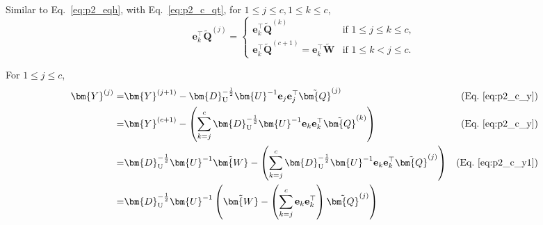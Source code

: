 \documentclass{article} %
\begin{document}
Similar to Eq.~\ref{eq:p2_eqh}, with Eq.~\ref{eq:p2_c_qt}, for $1 \le j \le c, 1 \le k \le c$,
\begin{equation}
\mathbf{e}_{k}^\top \tilde{\bm{Q}}^{(j)}
= \begin{cases}
\mathbf{e}_{k}^\top \tilde{\bm{Q}}^{(k)} & \text{if } 1 \le j \le k \le c ,\\
\mathbf{e}_{k}^\top \tilde{\bm{Q}}^{(c+1)} = \mathbf{e}_{k}^\top \tilde{\bm{W}}  & \text{if } 1 \le k < j \le c .
\end{cases}
\label{eq:p2_eqt}
\end{equation}

For $1 \le j \le c$,
\begin{equation}
\begin{aligned}
\bm{Y}^{(j)}
= & \bm{Y}^{(j+1)} - \bm{D}_{\mathrm{U}}^{-\frac{1}{2}} \bm{U}^{-1} \mathbf{e}_{j} \mathbf{e}_{j}^\top \tilde{\bm{Q}}^{(j)} & \text{(Eq.~\ref{eq:p2_c_y})} \\
= & \bm{Y}^{(c+1)} - \left( \sum_{k=j}^{c} \bm{D}_{\mathrm{U}}^{-\frac{1}{2}} \bm{U}^{-1} \mathbf{e}_{k} \mathbf{e}_{k}^\top \tilde{\bm{Q}}^{(k)} \right) & \text{(Eq.~\ref{eq:p2_c_y})} \\
= & \bm{D}_{\mathrm{U}}^{-\frac{1}{2}} \bm{U}^{-1} \tilde{\bm{W}} - \left( \sum_{k=j}^{c} \bm{D}_{\mathrm{U}}^{-\frac{1}{2}} \bm{U}^{-1} \mathbf{e}_{k} \mathbf{e}_{k}^\top \tilde{\bm{Q}}^{(j)} \right) & \text{(Eq.~\ref{eq:p2_c_y1})} \\
= & \bm{D}_{\mathrm{U}}^{-\frac{1}{2}} \bm{U}^{-1} \left( \tilde{\bm{W}} - \left( \sum_{k=j}^{c} \mathbf{e}_{k} \mathbf{e}_{k}^\top \right) \tilde{\bm{Q}}^{(j)} \right)
\end{aligned}
\label{eq:p2_y}
\end{equation}
\end{document}
